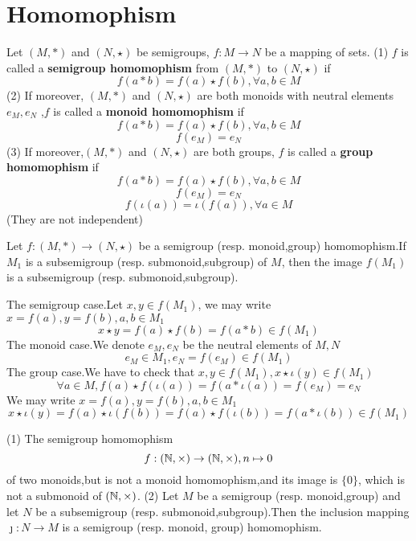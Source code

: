\documentclass{book}
\numberwithin{equation}{section}
\begin{document}
\section{Homomophism}
\begin{definitionenv}
    Let $(M,*)$ and $(N,\star)$ be  semigroups, $f:M\rightarrow N$ be a mapping of sets.
    \newline
    (1) $f$ is called a \textbf{semigroup homomophism} from $(M,*)$ to $(N,\star)$ if
    $$f(a*b)=f(a)\star f(b),\forall a,b\in M$$
    (2) If moreover, $(M,*)$ and $(N,\star)$ are both monoids with neutral elements $e_M,e_N$ ,$f$ is called a \textbf{monoid homomophism} if 
     $$f(a*b)=f(a)\star f(b),\forall a,b\in M$$ 
     $$f(e_M)=e_N$$
    (3) If moreover,$(M,*)$ and $(N,\star)$ are both groups, $f$ is called a \textbf{group homomophism} if 
    $$f(a*b)=f(a)\star f(b),\forall a,b\in M$$
    $$f(e_M)=e_N$$
    $$f(\iota(a))=\iota(f(a)),\forall a\in M$$
    (They are not independent)
\end{definitionenv}
\begin{propositionenv}
    \quad 
    \newline
    Let $f:(M,*)\rightarrow (N,\star)$ be a semigroup (resp. monoid,group) homomophism.If $M_1$ is a subsemigroup (resp. submonoid,subgroup) of $M$, then the image $f(M_1)$ is a subsemigroup (resp. submonoid,subgroup).
\end{propositionenv}
\begin{proofenv}
    The semigroup case.Let $x,y\in f(M_1)$, we may write $x=f(a),y=f(b),a,b\in M_1$
    $$x\star y=f(a)\star f(b)=f(a*b)\in f(M_1)$$
    The monoid case.We denote $e_M,e_N$ be the neutral elements of $M,N$
    $$e_M\in M_1,e_N=f(e_M)\in f(M_1)$$
    The group case.We have to check that $x,y\in f(M_1),x\star \iota(y)\in f(M_1)$
    $$\forall a\in M, f(a)\star f(\iota(a))=f(a*\iota(a))=f(e_M)=e_N$$
    We may write $x=f(a),y=f(b),a,b\in M_1$
    $$x\star \iota(y)=f(a)\star\iota(f(b))=f(a)\star f(\iota(b))=f(a*\iota(b))\in f(M_1)$$
\end{proofenv}
\begin{remark}
    \quad
    \newline
    (1) The semigroup homomophism
    $$f:(\mathbb{N},\times)\rightarrow (\mathbb{N},\times),n\mapsto 0$$
    of two monoids,but is not a monoid homomophism,and its image is $\{0\}$, which is not a submonoid of $(\mathbb{N},\times)$.
    \newline
    (2) Let $M$ be a semigroup (resp. monoid,group) and let $N$ be a subsemigroup (resp. submonoid,subgroup).Then the inclusion mapping $\jmath :N\rightarrow M$ is a semigroup (resp. monoid, group) homomophism.
\end{remark}
\end{document}
